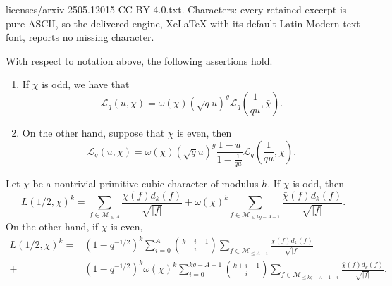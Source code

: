 \documentclass[10pt,a4paper]{amsart}
\newcommand{\cM}{\mathcal{M}}
\begin{document}
licenses/arxiv-2505.12015-CC-BY-4.0.txt. Characters: every retained excerpt is pure ASCII, so the delivered engine, XeLaTeX with its default Latin Modern text font, reports no missing character.
\begin{lemma} \label{functional equation lemma}
With respect to notation above, the following assertions hold.
\begin{enumerate}
    \item If $\chi$ is odd, we have that
    \begin{equation}\label{FE odd case}
\mathcal{L}_{q}(u, \chi) = \omega(\chi) (\sqrt{q} u)^{g} \mathcal{L}_{q} \left(\frac{1}{q u}, \bar{\chi} \right).
\end{equation}
\item On the other hand, suppose that $\chi$ is even, then 
\begin{equation}\label{FE even case}
\mathcal{L}_{q}(u, \chi) = \omega(\chi) (\sqrt{q} u)^{g} \frac{1 - u}{1 - \frac{1}{q u}} \mathcal{L}_{q} \left(\frac{1}{q u}, \bar{\chi} \right).
\end{equation}
\end{enumerate}
\end{lemma}

\begin{proposition}\label{approx funct eqn}
    Let $\chi$ be a nontrivial primitive cubic character of modulus $h$. If $\chi$ is odd, then
    \[L(1/2, \chi)^k=\sum_{f\in \cM_{\leq A}}\frac{\chi(f)d_k(f)}{\sqrt{|f|}}+ \omega(\chi)^k\sum_{f\in \cM_{\leq kg-A-1}}  \frac{\bar{\chi}(f) d_{k}(f)}{\sqrt{|f|}}.\]
    On the other hand, if $\chi$ is even, 
    \[\begin{split}L(1/2, \chi)^k=&(1-q^{-1/2})^k \sum_{i=0}^{A}\binom{k+i-1}{i}\sum_{f\in \cM_{\leq A-i}}\frac{\chi(f)d_k(f)}{\sqrt{|f|}} \\ + & (1-q^{-1/2})^k \omega(\chi)^k \sum_{i=0}^{kg-A-1}\binom{k+i-1}{i}\sum_{f\in \cM_{\leq kg-A-1-i}}  \frac{\bar{\chi}(f) d_{k}(f)}{\sqrt{|f|}}.
    \end{split}\]
\end{proposition}
\end{document}
